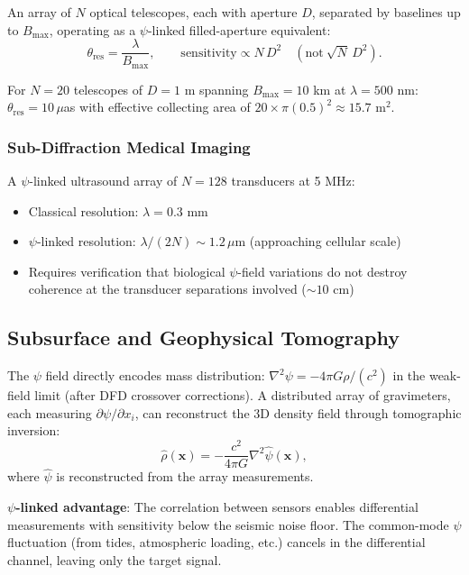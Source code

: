 \documentclass[12pt,a4paper]{article}
\theoremstyle{remark}
\begin{document}
An array of $N$ optical telescopes, each with aperture $D$, separated by
baselines up to $B_{\max}$, operating as a $\psi$-linked filled-aperture
equivalent:
\begin{equation}
\theta_{\text{res}} = \frac{\lambda}{B_{\max}}, \qquad
\text{sensitivity} \propto N\,D^2 \quad (\text{not}\ \sqrt{N}\,D^2).
\end{equation}

For $N = 20$ telescopes of $D = 1$ m spanning $B_{\max} = 10$ km at
$\lambda = 500$ nm: $\theta_{\text{res}} = 10\,\mu$as with effective
collecting area of $20 \times \pi(0.5)^2 \approx 15.7$ m$^2$.

\subsubsection{Sub-Diffraction Medical Imaging}

A $\psi$-linked ultrasound array of $N = 128$ transducers at 5 MHz:
\begin{itemize}
\item Classical resolution: $\lambda = 0.3$ mm
\item $\psi$-linked resolution: $\lambda/(2N) \sim 1.2\,\mu$m (approaching
cellular scale)
\item Requires verification that biological $\psi$-field variations do not
destroy coherence at the transducer separations involved ($\sim 10$ cm)
\end{itemize}

\subsection{Subsurface and Geophysical Tomography}\label{sec:geophysics}

The $\psi$ field directly encodes mass distribution:
$\nabla^2\psi = -4\pi G\rho/(c^2)$ in the weak-field limit (after DFD
crossover corrections). A distributed array of gravimeters, each measuring
$\partial\psi/\partial x_i$, can reconstruct the 3D density field through
tomographic inversion:
\begin{equation}
\hat{\rho}(\mathbf{x}) = -\frac{c^2}{4\pi G}\nabla^2\hat{\psi}(\mathbf{x}),
\end{equation}
where $\hat{\psi}$ is reconstructed from the array measurements.

\textbf{$\psi$-linked advantage}: The correlation between sensors enables
differential measurements with sensitivity below the seismic noise floor.
The common-mode $\psi$ fluctuation (from tides, atmospheric loading, etc.)
cancels in the differential channel, leaving only the target signal.
\end{document}
